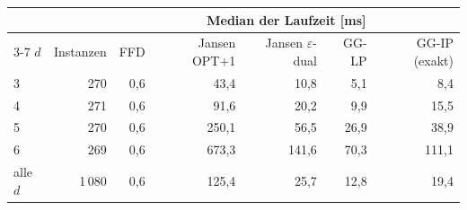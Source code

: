 \begin{tabular}{lrrrrrr}
\toprule
& & \multicolumn{5}{c}{Median der Laufzeit [ms]} \\
\cmidrule(lr){3-7}
$d$ & Instanzen & FFD & Jansen OPT+1 & Jansen $\varepsilon$-dual & GG-LP & GG-IP (exakt) \\
\midrule
3 & 270 & 0{,}6 & 43{,}4 & 10{,}8 & 5{,}1 & 8{,}4 \\
4 & 271 & 0{,}6 & 91{,}6 & 20{,}2 & 9{,}9 & 15{,}5 \\
5 & 270 & 0{,}6 & 250{,}1 & 56{,}5 & 26{,}9 & 38{,}9 \\
6 & 269 & 0{,}6 & 673{,}3 & 141{,}6 & 70{,}3 & 111{,}1 \\
\midrule
alle $d$ & 1\,080 & 0{,}6 & 125{,}4 & 25{,}7 & 12{,}8 & 19{,}4 \\
\bottomrule
\end{tabular}
